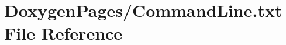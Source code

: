 \hypertarget{_command_line_8txt}{\section{Doxygen\-Pages/\-Command\-Line.txt File Reference}
\label{_command_line_8txt}
}
